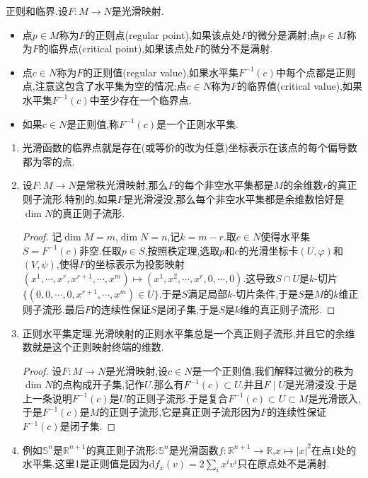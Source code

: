 正则和临界.设$F:M\to N$是光滑映射.
\begin{itemize}
	\item 点$p\in M$称为$F$的正则点(regular point),如果该点处$F$的微分是满射;点$p\in M$称为$F$的临界点(critical point),如果该点处$F$的微分不是满射.
	\item 点$c\in N$称为$F$的正则值(regular value),如果水平集$F^{-1}(c)$中每个点都是正则点,注意这包含了水平集为空的情况;点$c\in N$称为$F$的临界值(critical value),如果水平集$F^{-1}(c)$中至少存在一个临界点.
	\item 如果$c\in N$是正则值,称$F^{-1}(c)$是一个正则水平集.
\end{itemize}
\begin{enumerate}
	\item 光滑函数的临界点就是存在(或等价的改为任意)坐标表示在该点的每个偏导数都为零的点.
	\item 设$F:M\to N$是常秩光滑映射,那么$F$的每个非空水平集都是$M$的余维数$r$的真正则子流形.特别的,如果$F$是光滑浸没,那么每个非空水平集都是余维数恰好是$\dim N$的真正则子流形.
	\begin{proof}
		
		记$\dim M=m$,$\dim N=n$,记$k=m-r$.取$c\in N$使得水平集$S=F^{-1}(c)$非空.任取$p\in S$,按照秩定理,选取$p$和$c$的光滑坐标卡$(U,\varphi)$和$(V,\psi)$,使得$F$的坐标表示为投影映射$(x^1,\cdots,x^r,x^{r+1},\cdots,x^m)\mapsto(x^1,x^2,\cdots,x^r,0,\cdots,0)$.这导致$S\cap U$是$k$-切片$\{(0,0,\cdots,0,x^{r+1},\cdots,x^m)\in U\}$.于是$S$满足局部$k$-切片条件,于是$S$是$M$的$k$维正则子流形.最后$F$的连续性保证$S$是闭子集,于是$S$是$k$维的真正则子流形.
	\end{proof}
	\item 正则水平集定理.光滑映射的正则水平集总是一个真正则子流形,并且它的余维数就是这个正则映射终端的维数.
	\begin{proof}
		
		设$F:M\to N$是光滑映射,设$c\in N$是一个正则值,我们解释过微分的秩为$\dim N$的点构成开子集,记作$U$.那么有$F^{-1}(c)\subset U$.并且$F\mid U$是光滑浸没.于是上一条说明$F^{-1}(c)$是$U$的正则子流形.于是复合$F^{-1}(c)\subset U\subset M$是光滑嵌入,于是$F^{-1}(c)$是$M$的正则子流形,它是真正则子流形因为$F$的连续性保证$F^{-1}(c)$是闭子集.
	\end{proof}
    \item 例如$\mathbb{S}^n$是$\mathbb{R}^{n+1}$的真正则子流形:$\mathbb{S}^n$是光滑函数$f:\mathbb{R}^{n+1}\to\mathbb{R}$,$x\mapsto|x|^2$在点1处的水平集.这里1是正则值是因为$\mathrm{d}f_x(v)=2\sum_ix^iv^i$只在原点处不是满射.
\end{enumerate}

